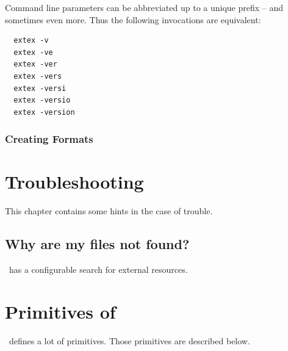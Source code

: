 \documentclass{extex-doc}
\begin{document}
Command line parameters can be abbreviated up to a unique prefix --
and sometimes even more. Thus the following invocations are
equivalent:

\begin{verbatim}
  extex -v
  extex -ve
  extex -ver
  extex -vers
  extex -versi
  extex -versio
  extex -version  
\end{verbatim}


\subsection{Creating Formats}

\INCOMPLETE


\chapter{Troubleshooting \ExTeX}

This chapter contains some hints in the case of trouble.

\section{Why are my files not found?}

\ExTeX\ has a configurable search for external resources.

\INCOMPLETE


\chapter{Primitives of \ExTeX}

\ExTeX\ defines a lot of primitives. Those primitives are described below.

\INCOMPLETE


\appendix



{\scriptsize\printindex}
\end{document}
